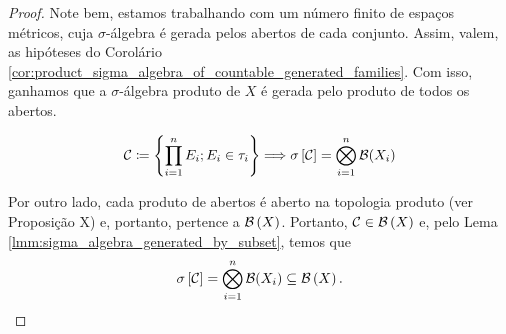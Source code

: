 \begin{proof}
    Note bem, estamos trabalhando com um número finito de espaços métricos, cuja $\sigma$-álgebra é gerada pelos abertos de cada conjunto. Assim, valem, as hipóteses do Corolário \ref{cor:product_sigma_algebra_of_countable_generated_families}. Com isso, ganhamos que a $\sigma$-álgebra produto de $X$ é gerada pelo produto de todos os abertos. 

    \begin{equation*}
        \mathcal{C}\coloneq \left\{\prod_{i=1}^{n} E_i; E_i \in \tau_i \right\} \Longrightarrow \sigma \left[\mathcal{C}\right] = \bigotimes_{i=1}^{n} \mathcal{B}(X_i)
    \end{equation*}
    
    Por outro lado, cada produto de abertos é aberto na topologia produto (ver Proposição X) e, portanto, pertence a $\mathcal{B}\left(X\right)$. Portanto, $\mathcal{C}\in\mathcal{B}\left(X\right)$ e, pelo Lema \ref{lmm:sigma_algebra_generated_by_subset}, temos que
    \begin{equation*}
        \sigma \left[\mathcal{C}\right] = \bigotimes_{i=1}^{n} \mathcal{B}(X_i) \subseteq \mathcal{B}\left(X\right).
    \end{equation*}
\end{proof}